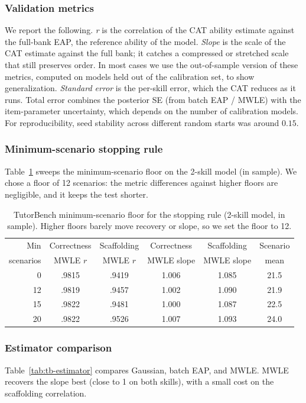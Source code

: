 \subsubsection{Validation metrics}
We report the following. \emph{r} is the correlation of the CAT ability estimate
against the full-bank EAP, the reference ability of the model. \emph{Slope} is
the scale of the CAT estimate against the full bank; it catches a compressed or
stretched scale that still preserves order. In most cases we use the
out-of-sample version of these metrics, computed on models held out of the
calibration set, to show generalization. \emph{Standard error} is the per-skill
error, which the CAT reduces as it runs. Total error combines the posterior SE
(from batch EAP / MWLE) with the item-parameter uncertainty, which depends on
the number of calibration models. For reproducibility, seed stability across
different random starts was around $0.15$.

\subsubsection{Minimum-scenario stopping rule}
Table~\ref{tab:tb-minscenario} sweeps the minimum-scenario floor on the 2-skill
model (in sample). We chose a floor of 12 scenarios: the metric differences
against higher floors are negligible, and it keeps the test shorter.

\begin{table}[t]
  \centering
  \caption{TutorBench minimum-scenario floor for the stopping rule (2-skill
    model, in sample). Higher floors barely move recovery or slope, so we set
    the floor to 12.}
  \label{tab:tb-minscenario}
  \begin{tabular}{rcccc c}
    \toprule
    Min & Correctness & Scaffolding & Correctness & Scaffolding & Scenario \\
    scenarios & MWLE $r$ & MWLE $r$ & MWLE slope & MWLE slope & mean \\
    \midrule
    0  & .9815 & .9419 & 1.006 & 1.085 & 21.5 \\
    12 & .9819 & .9457 & 1.002 & 1.090 & 21.9 \\
    15 & .9822 & .9481 & 1.000 & 1.087 & 22.5 \\
    20 & .9822 & .9526 & 1.007 & 1.093 & 24.0 \\
    \bottomrule
  \end{tabular}
\end{table}

\subsubsection{Estimator comparison}
Table~\ref{tab:tb-estimator} compares Gaussian, batch EAP, and MWLE. MWLE
recovers the slope best (close to 1 on both skills), with a small cost on the
scaffolding correlation.

